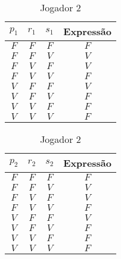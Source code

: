 \documentclass[a4paper,12pt]{article}
\begin{document}
\begin{enumerate}
\begin{enumerate}
 \begin{table}[htb]
\begin{center}
\begin{minipage}[htb]{0.4\linewidth}
\centering
 \begin{tabular}{|c|c|c|c|}
  \hline	
  \rowcolor[rgb]{0.9,0.9,0.9} { $p_1$} & { $r_1$} & { $s_1$} & {\bf Expressão} \\ \hline
   $F$   & $F$   & $F$   & $F$ \\ \hline
  \rowcolor[rgb]{1,0.2,0.2} $F$   & $F$   & $V$   & $V$ \\ \hline
  \rowcolor[rgb]{1,0.2,0.2} $F$   & $V$   & $F$   & $V$ \\ \hline
   $F$   & $V$   & $V$   & $F$ \\ \hline
  \rowcolor[rgb]{1,0.2,0.2} $V$   & $F$   & $F$   & $V$ \\ \hline
   $V$   & $F$   & $V$   & $F$ \\ \hline
   $V$   & $V$   & $F$   & $F$ \\ \hline
   $V$   & $V$   & $V$   & $F$ \\ \hline
\end{tabular}
\caption{Jogador 1}
\label{4e1}
\end{minipage}
\begin{minipage}[htb]{0.4\linewidth}
\centering
 \begin{tabular}{|c|c|c|c|}
  \hline	
  \rowcolor[rgb]{0.9,0.9,0.9} { $p_2$} & { $r_2$} & { $s_2$} & {\bf Expressão} \\ \hline
   $F$   & $F$   & $F$   & $F$ \\ \hline
  \rowcolor[rgb]{1,0.2,0.2} $F$   & $F$   & $V$   & $V$ \\ \hline
  \rowcolor[rgb]{1,0.2,0.2} $F$   & $V$   & $F$   & $V$ \\ \hline
   $F$   & $V$   & $V$   & $F$ \\ \hline
  \rowcolor[rgb]{1,0.2,0.2} $V$   & $F$   & $F$   & $V$ \\ \hline
   $V$   & $F$   & $V$   & $F$ \\ \hline
   $V$   & $V$   & $F$   & $F$ \\ \hline
   $V$   & $V$   & $V$   & $F$ \\ \hline
\end{tabular}
\caption{Jogador 2}
\label{4e2}
\end{minipage}
\end{center}
\end{table}


\end{enumerate}
\end{enumerate}
\end{document}
